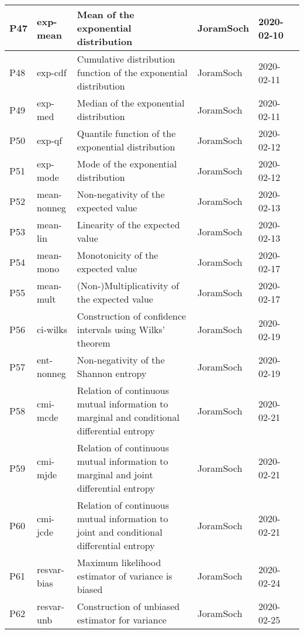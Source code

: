 \documentclass[a4paper,12pt,twoside]{book}
\begin{document}
\begin{longtable}{|p{1cm}|p{2cm}|p{6.5cm}|p{3cm}|p{2cm}|c|}
P47 & exp-mean & Mean of the exponential distribution & JoramSoch & 2020-02-10 & \pageref{sec:exp-mean} \\ \hline
P48 & exp-cdf & Cumulative distribution function of the exponential distribution & JoramSoch & 2020-02-11 & \pageref{sec:exp-cdf} \\ \hline
P49 & exp-med & Median of the exponential distribution & JoramSoch & 2020-02-11 & \pageref{sec:exp-med} \\ \hline
P50 & exp-qf & Quantile function of the exponential distribution & JoramSoch & 2020-02-12 & \pageref{sec:exp-qf} \\ \hline
P51 & exp-mode & Mode of the exponential distribution & JoramSoch & 2020-02-12 & \pageref{sec:exp-mode} \\ \hline
P52 & mean-nonneg & Non-negativity of the expected value & JoramSoch & 2020-02-13 & \pageref{sec:mean-nonneg} \\ \hline
P53 & mean-lin & Linearity of the expected value & JoramSoch & 2020-02-13 & \pageref{sec:mean-lin} \\ \hline
P54 & mean-mono & Monotonicity of the expected value & JoramSoch & 2020-02-17 & \pageref{sec:mean-mono} \\ \hline
P55 & mean-mult & (Non-)Multiplicativity of the expected value & JoramSoch & 2020-02-17 & \pageref{sec:mean-mult} \\ \hline
P56 & ci-wilks & Construction of confidence intervals using Wilks' theorem & JoramSoch & 2020-02-19 & \pageref{sec:ci-wilks} \\ \hline
P57 & ent-nonneg & Non-negativity of the Shannon entropy & JoramSoch & 2020-02-19 & \pageref{sec:ent-nonneg} \\ \hline
P58 & cmi-mcde & Relation of continuous mutual information to marginal and conditional differential entropy & JoramSoch & 2020-02-21 & \pageref{sec:cmi-mcde} \\ \hline
P59 & cmi-mjde & Relation of continuous mutual information to marginal and joint differential entropy & JoramSoch & 2020-02-21 & \pageref{sec:cmi-mjde} \\ \hline
P60 & cmi-jcde & Relation of continuous mutual information to joint and conditional differential entropy & JoramSoch & 2020-02-21 & \pageref{sec:cmi-jcde} \\ \hline
P61 & resvar-bias & Maximum likelihood estimator of variance is biased & JoramSoch & 2020-02-24 & \pageref{sec:resvar-bias} \\ \hline
P62 & resvar-unb & Construction of unbiased estimator for variance & JoramSoch & 2020-02-25 & \pageref{sec:resvar-unb} \\ \hline

\end{longtable}
\end{document}
